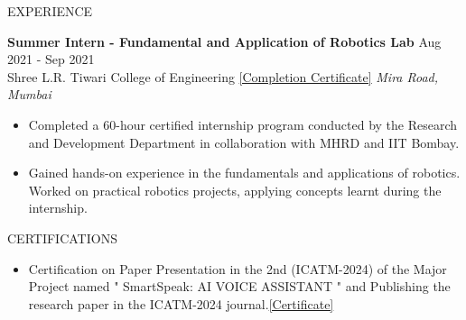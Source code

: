 \documentclass{resume} %
\begin{document}

\begin{rSection}{EXPERIENCE}

\textbf{Summer Intern - Fundamental and Application of Robotics Lab} \hfill Aug 2021 - Sep 2021\\
Shree L.R. Tiwari College of Engineering \href{https://drive.google.com/file/d/13E8hxdT5_Z6wY_oAUD6v-tK2hHk8x2a8/view?usp=sharing}{   [Completion Certificate]} \hfill \textit{Mira Road, Mumbai}
\begin{itemize}
    \item Completed a 60-hour certified internship program conducted by the Research and Development Department in collaboration with MHRD and IIT Bombay.
    \item Gained hands-on experience in the fundamentals and applications of robotics. Worked on practical robotics projects, applying concepts learnt during the internship.
\end{itemize}

\end{rSection}


\begin{rSection}{CERTIFICATIONS}
\begin{itemize}
    \item Certification on Paper Presentation in the 2nd (ICATM-2024) of the Major Project named " SmartSpeak: AI VOICE ASSISTANT " and Publishing the research paper in the ICATM-2024 journal.\href{https://drive.google.com/file/d/1WaL93tJuPJN1cGxox7ekrVcnih9mXzwu/view?usp=sharing}{[Certificate]}
    
\end{itemize}

\end{rSection}


\end{document}
